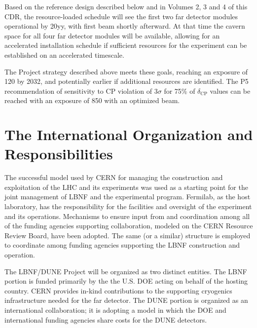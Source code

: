 Based on the reference design described below and in Volumes 2, 3 and 4 of this %
CDR, the resource-loaded schedule will see the first two  far detector modules 
operational by 20yy, %
with first beam shortly afterward. At that time the cavern 
space for all four  far detector modules will be available, allowing for 
an accelerated installation schedule if sufficient resources   for
the experiment can be established on an accelerated timescale.  

\vspace{6pt}
The Project strategy described above meets these goals, 
 reaching an exposure of 
\num{120}\ktMWyr{} by 2032, and potentially earlier if additional resources are identified. 
The P5 recommendation of sensitivity to CP violation of 3$\sigma$ for 75\% of $\delta_\text{CP}$
values can be reached with an exposure of \num{850}\ktMWyr{} with an optimized beam.

\section{The International Organization and Responsibilities}

The successful model used by CERN for managing the construction and exploitation of the LHC and its experiments was used as a starting point for the joint management of LBNF and the experimental program.  Fermilab, as the host laboratory, has the responsibility for the facilities and oversight of the experiment and its operations.  Mechanisms to ensure input from and coordination among all of the funding agencies supporting collaboration, 
 modeled on the CERN Resource Review Board, have been adopted. The same (or a similar) structure is employed to coordinate among funding agencies supporting the LBNF construction and operation.  

The LBNF/DUNE Project will be organized as two distinct entities. The LBNF portion is funded primarily
by the the U.S. DOE acting on behalf of the hosting country.   CERN provides in-kind contributions to the supporting cryogenics infrastructure needed for the far detector. The DUNE portion is organized
as an international collaboration; it is adopting a model in which the DOE and international funding agencies share costs %
for the DUNE detectors.

